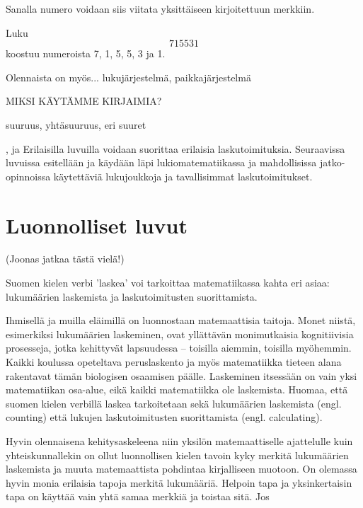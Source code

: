Sanalla numero voidaan siis viitata yksittäiseen kirjoitettuun merkkiin. 

\begin{esimerkki}
Luku \[715531\] koostuu numeroista 7, 1, 5, 5, 3 ja 1.
\end{esimerkki}



Olennaista on myös...
lukujärjestelmä, paikkajärjestelmä

MIKSI KÄYTÄMME KIRJAIMIA?

suuruus, yhtäsuuruus, eri suuret

, ja Erilaisilla luvuilla voidaan suorittaa erilaisia laskutoimituksia. Seuraavissa luvuissa esitellään ja käydään läpi lukiomatematiikassa ja mahdollisissa jatko-opinnoissa käytettäviä lukujoukkoja ja tavallisimmat laskutoimitukset.

\chapter{Luonnolliset luvut}

(Joonas jatkaa tästä vielä!)

Suomen kielen verbi 'laskea' voi tarkoittaa matematiikassa kahta eri asiaa: lukumäärien laskemista ja laskutoimitusten suorittamista.


Ihmisellä ja muilla eläimillä on luonnostaan matemaattisia taitoja. Monet niistä, esimerkiksi lukumäärien laskeminen, ovat yllättävän monimutkaisia kognitiivisia prosesseja, jotka kehittyvät lapsuudessa – toisilla aiemmin, toisilla myöhemmin. Kaikki koulussa opeteltava peruslaskento ja myös matematiikka tieteen alana rakentavat tämän biologisen osaamisen päälle. Laskeminen itsessään on vain yksi matematiikan osa-alue, eikä kaikki matematiikka ole laskemista. Huomaa, että suomen kielen verbillä laskea tarkoitetaan sekä lukumäärien laskemista (engl. counting) että lukujen laskutoimitusten suorittamista (engl. calculating).

Hyvin olennaisena kehitysaskeleena niin yksilön matemaattiselle ajattelulle kuin yhteiskunnallekin on ollut luonnollisen kielen tavoin kyky merkitä lukumäärien laskemista ja muuta matemaattista pohdintaa kirjalliseen muotoon.  On olemassa hyvin monia erilaisia tapoja merkitä lukumääriä. Helpoin tapa ja yksinkertaisin tapa on käyttää vain yhtä samaa merkkiä ja toistaa sitä. Jos

